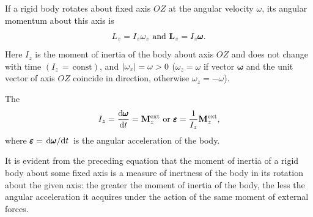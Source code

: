 \subsection{}\label{4.3.4} If a rigid body rotates about fixed axis $OZ$ at the angular velocity $\omega$, its angular momentum about this axis is
\begin{equation*}%
L_{z} = I_{z} \omega_{z}\,\, \textrm{and}\,\, \vb{L}_{z} = I_{z}\pmb{\omega}.
\end{equation*}
Here $I_{z}$ is the moment of inertia of the body about axis $OZ$ and does not change with time $(I_{z}\,= \,\textrm{const})$, and $\abs{\omega_{z}} = \omega > 0$ ($\omega_{z} = \omega$ if vector $\pmb{\omega}$ and the unit vector of axis $OZ$ coincide in direction, otherwise $\omega_{z} = - \omega$).

The 
\begin{equation*}%
I_{z} = \dv{\pmb{\omega}}{t} =  \vb{M}^{\textrm{ext}}_{z} \,\, \textrm{or} \,\, \pmb{\varepsilon} = \frac{1}{I_{z}} \vb{M}^{\textrm{ext}}_{z},
\end{equation*}
where $\pmb{\varepsilon} = \dv*{\pmb{\omega}}{t}$ is the angular acceleration of the body.

It is evident from the preceding equation that the moment of inertia of a rigid body about some fixed axis is a measure of inertness of the body in its rotation about the given axis: the greater the moment of inertia of the body, the less the angular acceleration it acquires under the action of the same moment of
external forces.

